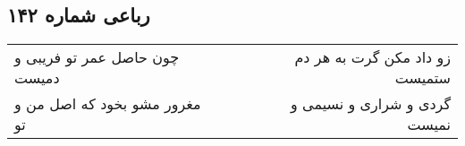 \begin{center}
\section*{رباعی شماره ۱۴۲}
\label{sec:sh142}
\begin{longtable}{l p{0.5cm} r}
چون حاصل عمر تو فریبی و دمیست
&&
زو داد مکن گرت به هر دم ستمیست
\\
مغرور مشو بخود که اصل من و تو
&&
گردی و شراری و نسیمی و نمیست
\\
\end{longtable}
\end{center}
